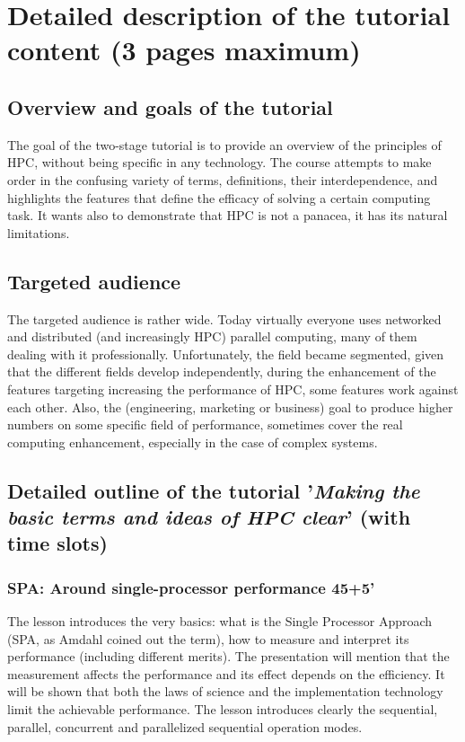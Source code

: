 \documentclass[preprint,12pt,authoryear]{article}
\begin{document}
\section{Detailed description of the tutorial content (3 pages maximum)}
	\subsection{Overview and goals of the tutorial}
	The goal of the two-stage tutorial is to provide an overview of 
	the principles of HPC, without being specific in any technology.
	The course attempts to make order in the confusing variety of terms, definitions, their interdependence, and highlights the features that define the efficacy of solving a certain computing task. It wants also to demonstrate that HPC
	is not a panacea, it has its natural limitations.
	
	\subsection{Targeted audience}
	The targeted audience is rather wide. Today virtually everyone uses
	networked and distributed (and increasingly HPC) parallel computing, many of them dealing with it professionally. Unfortunately, the field became segmented, given that the
	different fields develop independently, during the enhancement of the features 
	targeting increasing the performance of HPC, some features work against each other. Also, the (engineering, marketing or business) goal to produce
	higher numbers on some specific field of performance, sometimes cover
	the real computing enhancement, especially in the case of complex systems.
	
	\subsection{Detailed outline of the tutorial '\textit{Making the basic terms and ideas of HPC clear}' (with time slots)}
	    \subsubsection{SPA: Around single-processor performance 45+5'}
	    The lesson introduces the very basics: what is the Single Processor Approach (SPA, as Amdahl coined out the term), how to measure and interpret its performance (including different merits).
	    The presentation will mention that the measurement affects
	    the performance and its effect depends on the efficiency.
	    It will be shown that both the laws of science and the
	    implementation technology  limit  the achievable
	    performance.  The lesson introduces
	    clearly the sequential, parallel, concurrent and parallelized sequential operation modes.
	    
\end{document}
